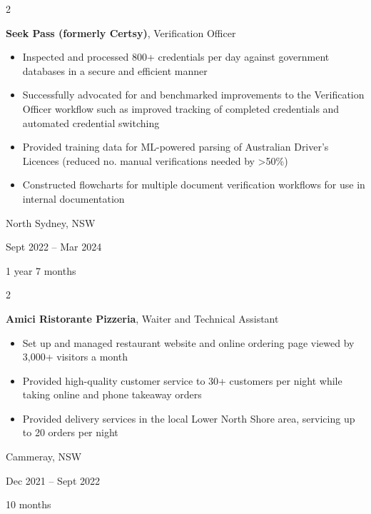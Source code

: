 \documentclass[10pt, a4paper]{article}
\newenvironment{highlights}{
    \begin{itemize}[
        topsep=0.10 cm,
        parsep=0.10 cm,
        partopsep=0pt,
        itemsep=0pt,
        leftmargin=0.4 cm + 10pt
    ]
}{
    \end{itemize}
} %
\newenvironment{twocolentry}[2][]{
    \onecolentry
    \def\secondColumn{#2}
    \setcolumnwidth{\fill, 4.5 cm}
    \begin{paracol}{2}
}{
    \switchcolumn \raggedleft \secondColumn
    \end{paracol}
    \endonecolentry
} %
\begin{document}
        
        \begin{twocolentry}{
            North Sydney, NSW

        Sept 2022 – Mar 2024

        1 year 7 months
        }
            \textbf{Seek Pass (formerly Certsy)}, Verification Officer
            \begin{highlights}
                \item Inspected and processed 800+ credentials per day against government databases in a secure and efficient manner
                \item Successfully advocated for and benchmarked improvements to the Verification Officer workflow such as improved tracking of completed credentials and automated credential switching
                \item Provided training data for ML-powered parsing of Australian Driver's Licences (reduced no. manual verifications needed by >50\%)
                \item Constructed flowcharts for multiple document verification workflows for use in internal documentation
            \end{highlights}
        \end{twocolentry}


        \vspace{0.2 cm}

        \begin{twocolentry}{
            Cammeray, NSW

        Dec 2021 – Sept 2022

        10 months
        }
            \textbf{Amici Ristorante Pizzeria}, Waiter and Technical Assistant
            \begin{highlights}
                \item Set up and managed restaurant website and online ordering page viewed by 3,000+ visitors a month
                \item Provided high-quality customer service to 30+ customers per night while taking online and phone takeaway orders
                \item Provided delivery services in the local Lower North Shore area, servicing up to 20 orders per night
            \end{highlights}
        \end{twocolentry}


        \vspace{0.2 cm}
\end{document}
